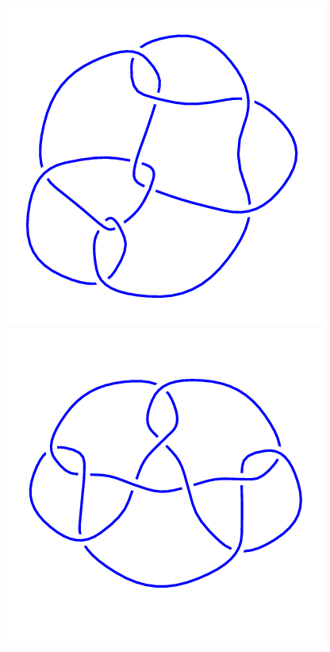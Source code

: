 \begin{figure}[H]
\begin{minipage}[b]{.18\linewidth}
    \end{minipage}
    \begin{minipage}[b]{.18\linewidth}
        \centering
        \includegraphics[width=\linewidth]{../data/10_59.png}
    \end{minipage}
    \begin{minipage}[b]{.18\linewidth}
        \centering
        \includegraphics[width=\linewidth]{../data/10_60.png}

\end{minipage}
\end{figure}

